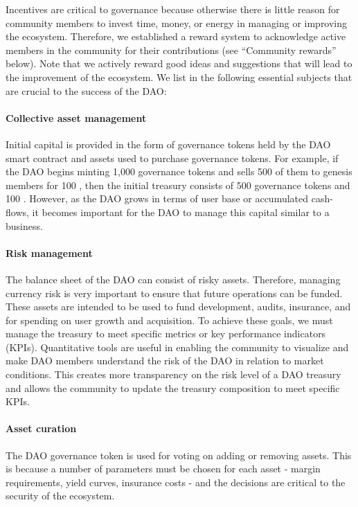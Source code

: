 Incentives are critical to governance because otherwise there is little reason for community members to invest time, money, or energy in managing or improving the ecosystem.
Therefore, we established a reward system to acknowledge active members in the community for their contributions (see ``Community rewards'' below).
Note that we actively reward good ideas and suggestions that will lead to the improvement of the ecosystem.
We list in the following essential subjects that are crucial to the success of the DAO:

\paragraph{\textbf{Collective asset management}}
Initial capital is provided in the form of governance tokens held by the DAO smart contract and assets used to purchase governance tokens.
For example, if the DAO begins minting 1,000 governance tokens and sells 500 of them to genesis members for 100 \eth, then the initial treasury consists of 500 governance tokens and 100 \eth. 
However, as the DAO grows in terms of user base or accumulated cash-flows, it becomes important for the DAO to manage this capital similar to a business.

\paragraph{\textbf{Risk management}}
The balance sheet of the DAO can consist of risky assets.
Therefore, managing currency risk is very important to ensure that future operations can be funded.
These assets are intended to be used to fund development, audits, insurance, and for spending on user growth and acquisition. 
To achieve these goals, we must manage the treasury to meet specific metrics or key performance indicators (KPIs).
Quantitative tools are useful in enabling the community to visualize and make DAO members understand the risk of the DAO in relation to market conditions.
This creates more transparency on the risk level of a DAO treasury and allows the community to update the treasury composition to meet specific KPIs.

\paragraph{\textbf{Asset curation}}
The DAO governance token is used for voting on adding or removing assets. 
This is because a number of parameters must be chosen for each asset - margin requirements, yield curves, insurance costs - and the decisions are critical to the security of the ecosystem. 

